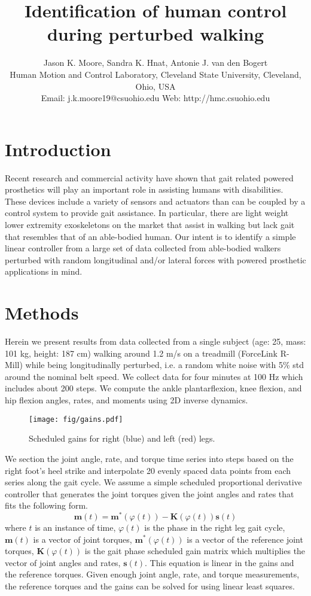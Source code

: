 \documentclass[10pt,letterpaper,notitlepage,twocolumn]{article}
\title{\bf Identification of human control during perturbed walking}
\author{
  Jason K. Moore, Sandra K. Hnat, Antonie J. van den Bogert\\
  Human Motion and Control Laboratory, Cleveland State University, Cleveland, Ohio, USA\\
  Email: j.k.moore19@csuohio.edu Web: http://hmc.csuohio.edu
}
\date{}
\begin{document}

\maketitle

\section*{Introduction}
%
Recent research and commercial activity have shown that gait related powered
prosthetics will play an important role in assisting humans with disabilities.
These devices include a variety of sensors and actuators than can be coupled by
a control system to provide gait assistance. In particular, there are light
weight lower extremity exoskeletons on the market that assist in walking but
lack gait that resembles that of an able-bodied human. Our intent is to
identify a simple linear controller from a large set of data collected from
able-bodied walkers perturbed with random longitudinal and/or lateral forces
with powered prosthetic applications in mind.
%
\section*{Methods}
Herein we present results from data collected from a single subject (age: 25,
mass: 101 kg, height: 187 cm) walking around 1.2 m/s on a treadmill (ForceLink
R-Mill) while being longitudinally perturbed, i.e. a random white noise with
5\% std around the nominal belt speed. We collect data for four minutes at 100
Hz which includes about 200 steps. We compute the ankle plantarflexion, knee
flexion, and hip flexion angles, rates, and moments using 2D inverse dynamics.
%
\begin{figure}[hbt]
  \begin{center}
    \texttt{[image: fig/gains.pdf]}
    \caption{Scheduled gains for right (blue) and left (red) legs.}
    \label{fig:gains}
  \end{center}
\end{figure}

We section the joint angle, rate, and torque time series into steps based on
the right foot's heel strike and interpolate 20 evenly spaced data points from
each series along the gait cycle. We assume a simple scheduled proportional
derivative controller that generates the joint torques given the joint angles
and rates that fits the following form.
%
\begin{equation}
  \mathbf{m}(t) = \mathbf{m}^*(\varphi(t)) -
  \mathbf{K}(\varphi(t))\mathbf{s}(t)
\end{equation}
%
where $t$ is an instance of time, $\varphi(t)$ is the phase in the right leg
gait cycle, $\mathbf{m}(t)$ is a vector of joint torques,
$\mathbf{m}^*(\varphi(t))$ is a vector of the reference joint torques,
$\mathbf{K}(\varphi(t))$ is the gait phase scheduled gain matrix which
multiplies the vector of joint angles and rates, $\mathbf{s}(t)$. This equation
is linear in the gains and the reference torques. Given enough joint angle,
rate, and torque measurements, the reference torques and the gains can be
solved for using linear least squares.
\end{document}
